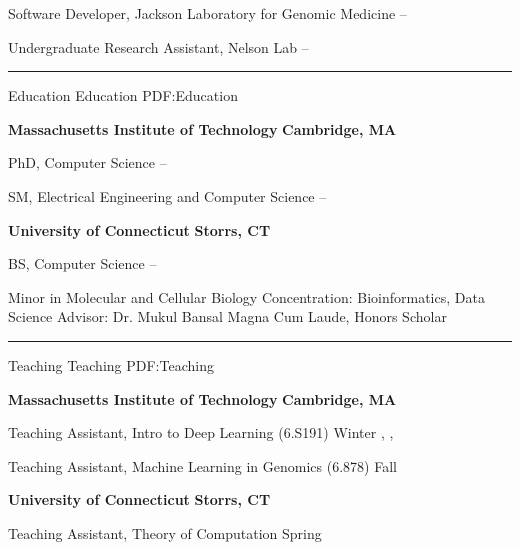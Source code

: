 \documentclass[letterpaper,MMMyyyy,nonstopmode]{simpleresumecv}
\begin{document}
\begin{Body}
\Gap
\Item Software Developer, Jackson Laboratory for Genomic Medicine
\hfill
{} --

\Gap
\Item Undergraduate Research Assistant, Nelson Lab
\hfill
{} --

\BigGap
\hrule
\Section
{Education}
{Education}
{PDF:Education}

\Entry
\textbf{Massachusetts Institute of Technology}
\hfill \textbf{Cambridge, MA}

\Gap
\Item PhD, Computer Science
\hfill
{} --
\Gap
\begin{Detail}
\end{Detail}
\Gap

\Item SM, Electrical Engineering and Computer Science
\hfill
{} --
\BigGap

\Entry
\textbf{University of Connecticut}
\hfill \textbf{Storrs, CT}

\Gap
\Item BS, Computer Science
\hfill
{} --
\Gap
\begin{Detail}
\SubBulletItem Minor in Molecular and Cellular Biology
\SubBulletItem Concentration: Bioinformatics, Data Science
\SubBulletItem Advisor: Dr. Mukul Bansal
\SubBulletItem Magna Cum Laude, Honors Scholar
\end{Detail}


\BigGap
\hrule
\Section
{Teaching}
{Teaching}
{PDF:Teaching}

\Entry
{\textbf{Massachusetts Institute of Technology}}
\hfill \textbf{Cambridge, MA}

\Gap
\Item Teaching Assistant, Intro to Deep Learning (6.S191)
\hfill
Winter , , 

\Gap
\Item Teaching Assistant, Machine Learning in Genomics (6.878)
\hfill
Fall 

\BigGap
\Entry
{\textbf{University of Connecticut}}
\hfill \textbf{Storrs, CT}

\Gap
\Item Teaching Assistant, Theory of Computation
\hfill
Spring 



\end{Body}
\end{document}
